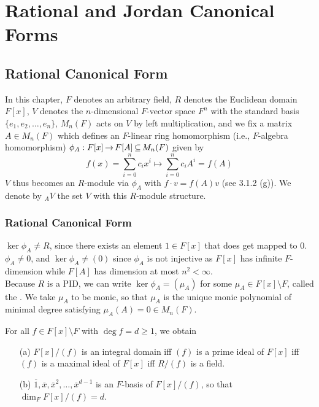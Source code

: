 \documentclass[11pt]{book}
\theoremstyle{definition}   \newtheorem{defn}[counter]{Definition} %
\newcommand{\ov}{\overline}   \newcommand{\wt}{\widetilde}
\newcommand{\bs}{\setminus}   \newcommand{\A}{\mathcal{A}}   \newcommand{\sy}{\textnormal{Syl}}   \newcommand{\size}[1]{\left| #1 \right|}
\DeclareMathOperator{\ra}{\rightarrow}   \DeclareMathOperator{\Poly}{\mathbf{P}}   \DeclareMathOperator{\spn}{\textnormal{span}}   \DeclareMathOperator{\aut}{\textnormal{Aut}}
\newcommand{\vs}{\vspace{8pt}}   \newcommand{\hs}{\hspace{8pt}}
\numberwithin{counter}{chapter}
\begin{document}
\part{Rational and Jordan Canonical Forms}





\chapter{Rational Canonical Form}

In this chapter, $F$ denotes an arbitrary field, $R$ denotes the Euclidean domain $F[x]$, $V$ denotes the $n$-dimensional $F$-vector space $F^n$ with the standard basis $\{e_1,e_2,\dots,e_n\}$, $M_n(F)$ acts on $V$ by left multiplication, and we fix a matrix $A \in M_n(F)$ which defines an $F$-linear ring homomorphism (i.e., $F$-algebra homomorphism) $\phi_A : F[x] \ra F[A] \sub M_n(F)$ given by
	\[f(x) = \sum_{i=0}^n c_i x^i \mapsto \sum_{i=0}^n c_i A^i = f(A) \]
$V$ thus becomes an $R$-module via $\phi_A$ with $f \cdot v = f(A) v$ (see 3.1.2 (g)). We denote by $_AV$ the set $V$ with this $R$-module structure.

\section{Rational Canonical Form}

\begin{remark}[+ Definition]
$\ker \phi_A \ne R$, since there exists an element $1 \in F[x]$ that does get mapped to 0.  $\phi_A \ne 0$, and $\ker \phi_A \ne (0)$ since $\phi_A$ is not injective as $F[x]$ has infinite $F$-dimension while $F[A]$ has dimension at most $n^2 < \infty$. \\

Because $R$ is a PID, we can write $\ker \phi_A = (\mu_A)$ for some $\mu_A \in F[x]\bs F$, called the . We take $\mu_A$ to be monic, so that $\mu_A$ is the unique monic polynomial of minimal degree satisfying $\mu_A(A) = 0 \in M_n(F)$.
\end{remark}

\vs

\begin{lemma}
For all $f \in F[x]\bs F$ with $\deg f = d \geq 1$, we obtain
\begin{enumerate}
\item[(a)] $F[x]/(f)$ is an integral domain iff $(f)$ is a prime ideal of $F[x]$ iff $(f)$ is a maximal ideal of $F[x]$ iff $R/(f)$ is a field.
\item[(b)] $\ov{1}, \ov{x}, \ov{x}^2,\dots,\ov{x}^{d-1}$ is an $F$-basis of $F[x]/(f)$, so that $\dim_F F[x]/(f) = d$.
\end{enumerate}
\end{lemma}
\end{document}
